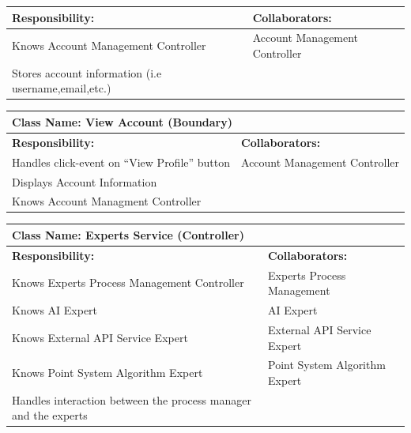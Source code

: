 \documentclass[]{article}
\begin{document}
\begin{itemize}
\begin{table}[H]
\begin{tabular}{|p{6cm}|p{6cm}|}
            \hline
            \textbf{Responsibility:} & \textbf{Collaborators:} \\
            \hline
            Knows Account Management Controller & Account Management Controller\\ 
                 Stores account information (i.e username,email,etc.) & \\
            \hline
            \end{tabular}
        \end{table}
        \begin{table}[H]
            \centering
            \begin{tabular}{|p{6cm}|p{6cm}|}
            \hline 
             \multicolumn{2}{|l|}{\textbf{Class Name: View Account (Boundary)}} \\
            \hline
            \textbf{Responsibility:} & \textbf{Collaborators:} \\
            \hline
            Handles click-event on “View Profile” button & Account Management Controller\\
            Displays Account Information &  \\
                Knows Account Managment Controller &  \\
            \hline
            \end{tabular}
        \end{table}
        \begin{table}[H]
            \centering
            \begin{tabular}{|p{6cm}|p{6cm}|}
            \hline 
             \multicolumn{2}{|l|}{\textbf{Class Name: Experts Service (Controller)}} \\
            \hline
            \textbf{Responsibility:} & \textbf{Collaborators:} \\
            \hline
            Knows Experts Process Management Controller & Experts Process Management \\
            Knows AI Expert & AI Expert \\
            Knows External API Service Expert & External API Service Expert \\
            Knows Point System Algorithm Expert & Point System Algorithm Expert \\
            Handles interaction between the process manager and the experts & \\
            \hline
            \end{tabular}
        \end{table}

\end{itemize}
\end{document}
